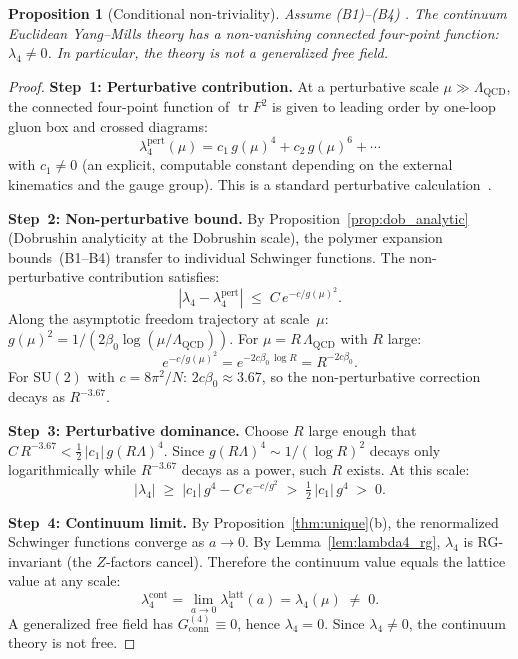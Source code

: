 \documentclass[11pt,a4paper]{article}
\theoremstyle{plain}
\newtheorem{proposition}[theorem]{Proposition}
\theoremstyle{definition}
\theoremstyle{remark}
\newcommand{\tr}{\operatorname{tr}}
\newcommand{\SU}{\mathrm{SU}}
\begin{document}
\begin{proposition}[Conditional non-triviality]
\label{thm:nontrivial}
Assume (B1)--(B4) \cite{FontesSU2}.
The continuum Euclidean Yang--Mills theory has a
non-vanishing connected four-point function:
$\lambda_4 \neq 0$.  In particular, the theory is not
a generalized free field.
\end{proposition}

\begin{proof}
\textbf{Step~1: Perturbative contribution.}
At a perturbative scale $\mu \gg \Lambda_{\mathrm{QCD}}$,
the connected four-point function of $\tr F^2$ is given
to leading order by one-loop gluon box and crossed
diagrams:
\begin{equation}\label{eq:lambda4_pert}
  \lambda_4^{\mathrm{pert}}(\mu)
  = c_1\,g(\mu)^4 + c_2\,g(\mu)^6 + \cdots
\end{equation}
with $c_1 \neq 0$ (an explicit, computable constant
depending on the external kinematics and the gauge group).
This is a standard perturbative calculation~\cite{Seiler82}.

\smallskip
\textbf{Step~2: Non-perturbative bound.}
By Proposition~\ref{prop:dob_analytic} (Dobrushin
analyticity at the Dobrushin scale), the polymer expansion
bounds~(B1--B4) transfer to individual Schwinger functions.
The non-perturbative contribution satisfies:
\begin{equation}
  |\lambda_4 - \lambda_4^{\mathrm{pert}}|
  \;\leq\; C\,e^{-c/g(\mu)^2}.
\end{equation}
Along the asymptotic freedom trajectory at
scale~$\mu$: $g(\mu)^2 = 1/(2\beta_0 \log(\mu
/\Lambda_{\mathrm{QCD}}))$.  For
$\mu = R\,\Lambda_{\mathrm{QCD}}$ with $R$ large:
\begin{equation}
  e^{-c/g(\mu)^2}
  = e^{-2c\beta_0\,\log R}
  = R^{-2c\beta_0}.
\end{equation}
For $\SU(2)$ with $c = 8\pi^2/N$:
$2c\beta_0 \approx 3.67$, so the non-perturbative
correction decays as $R^{-3.67}$.

\smallskip
\textbf{Step~3: Perturbative dominance.}
Choose $R$ large enough that
$C\,R^{-3.67} < \tfrac{1}{2}\,|c_1|\,g(R\Lambda)^4$.
Since $g(R\Lambda)^4 \sim 1/(\log R)^2$ decays only
logarithmically while $R^{-3.67}$ decays as a power,
such $R$ exists.  At this scale:
\begin{equation}
  |\lambda_4| \;\geq\;
  |c_1|\,g^4 - C\,e^{-c/g^2}
  \;>\; \tfrac{1}{2}\,|c_1|\,g^4 \;>\; 0.
\end{equation}

\smallskip
\textbf{Step~4: Continuum limit.}
By Proposition~\ref{thm:unique}(b), the renormalized
Schwinger functions converge as $a \to 0$.  By
Lemma~\ref{lem:lambda4_rg}, $\lambda_4$ is
RG-invariant (the $Z$-factors cancel).  Therefore the
continuum value equals the lattice value at any scale:
\begin{equation}
  \lambda_4^{\mathrm{cont}}
  = \lim_{a \to 0} \lambda_4^{\mathrm{latt}}(a)
  = \lambda_4(\mu)
  \;\neq\; 0.
\end{equation}
A generalized free field has
$G_{\mathrm{conn}}^{(4)} \equiv 0$, hence
$\lambda_4 = 0$.  Since $\lambda_4 \neq 0$,
the continuum theory is not free.
\end{proof}
\end{document}
